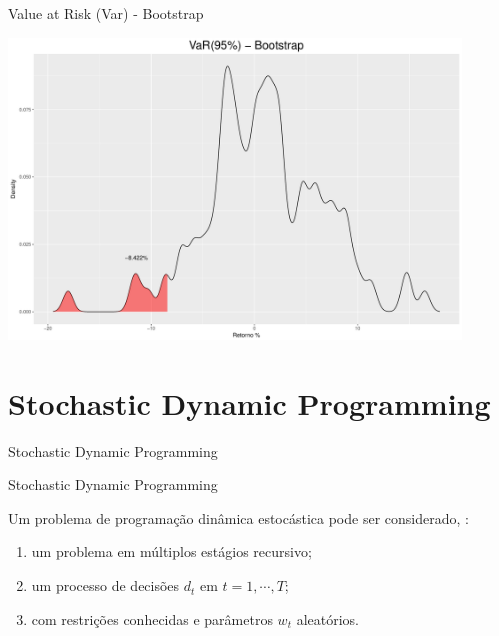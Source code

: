 \documentclass{beamer}
\begin{document}
\begin{frame}{Value at Risk (Var) - Bootstrap}

\begin{center}
 \includegraphics[height=8cm,keepaspectratio]{VAR_boots.pdf}
 \end{center}
 
\end{frame}



\section{Stochastic Dynamic Programming}

\begin{frame}{ }
    \begin{block}{ }
      \Huge  Stochastic Dynamic Programming
    \end{block}
\end{frame}


\begin{frame}{Stochastic Dynamic Programming}

Um problema de programação dinâmica estocástica pode ser considerado, \citep{Consigli1998}:

\begin{enumerate}
\item um problema em múltiplos estágios recursivo;
\item um processo de decisões $d_t$ em $t=1,\cdots,T$;
\item com restrições conhecidas e parâmetros $w_t$ aleatórios. 
\end{enumerate}

\end{frame}
\end{document}
